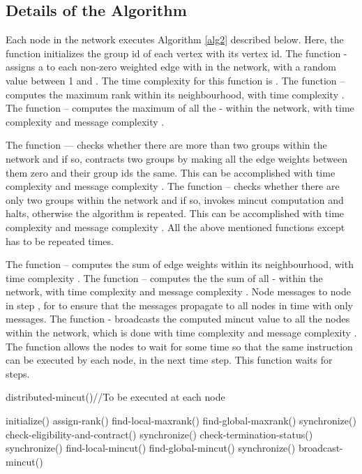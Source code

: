 \documentclass{acm_proc_article-sp}
\begin{document}
\subsection{Details of the Algorithm}

Each node in the network executes Algorithm \ref{alg2} described below. Here, the function  initializes the group id of each vertex with its vertex id. The function - assigns a  to each non-zero weighted edge with in the network, with a random value between 1 and . The time complexity for this function is . The function -- computes the maximum rank within its neighbourhood, with time complexity . The function -- computes the maximum of all the - within the network, with time complexity  and message complexity .

The function --- checks whether there are more than two groups within the network and if so, contracts two groups by making all the edge weights between them zero and their group ids the same. This can be accomplished with time complexity  and message complexity . The function -- checks whether there are only two groups within the network and if so, invokes mincut computation and halts, otherwise the algorithm is repeated. This can be accomplished with time complexity  and message complexity . All the above mentioned functions except  has to be repeated  times.

The function -- computes the sum of edge weights within its neighbourhood, with time complexity . The function -- computes the the sum of all - within the network, with time complexity  and message complexity .  Node  messages to node  in step , for  to ensure that the messages propagate to all nodes in  time with only  messages. The function - broadcasts the computed mincut value to all the nodes within the network, which is done with time complexity  and message complexity . The function  allows the nodes to wait for some time so that the same instruction can be executed by each node, in the next time step. This function waits for  steps.

\begin{algorithm}                      \caption{distributed-mincut()\;\;\;\;\;//To be executed at each node}   \label{alg2}                           \begin{algorithmic}
\STATE initialize()
\REPEAT
\STATE assign-rank()
\STATE find-local-maxrank()
\STATE find-global-maxrank()
\STATE synchronize()
\STATE check-eligibility-and-contract()
\STATE synchronize()
\STATE check-termination-status()
\STATE synchronize()
\UNTIL{}
\STATE find-local-mincut()
\STATE find-global-mincut()
\STATE synchronize()
\STATE broadcast-mincut()
\end{algorithmic}
\end{algorithm}
\end{document}
